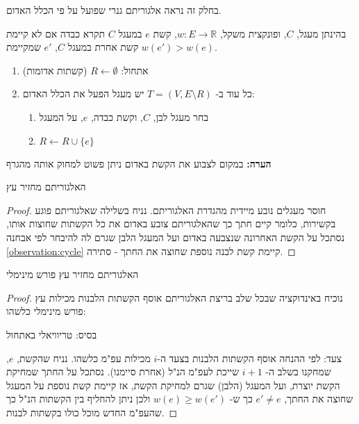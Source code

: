 בחלק זה נראה אלגוריתם גנרי שפועל על פי הכלל האדום.

\begin{definition}
בהינתן מעגל, $C$, ופונקצית משקל, 
$w: E \to \mathbb{R}$,
קשת $e$ במעגל $C$ תקרא כבדה אם לא קיימת קשת אחרת במעגל $C$, 
$e'$
שמקיימת 
$w(e') > w(e)$.
\end{definition}
\begin{enumerate}
\item
אתחול:
$R \leftarrow \emptyset$ 
(קשתות אדומות)
\item
כל עוד ב-%
$T = (V, E \setminus R)$
יש מעגל הפעל את הכלל האדום:
\begin{enumerate}
\item
בחר מעגל לבן, $C$, וקשת כבדה, $e$, על המעגל
\item
$R \leftarrow R \cup \{e\}$
\end{enumerate}
\end{enumerate}

\textbf{הערה:}
במקום לצבוע את הקשת באדום ניתן פשוט למחוק אותה מהגרף
\begin{claim}
האלגוריתם מחזיר עץ
\end{claim}
\begin{proof}
חוסר מעגלים נובע מיידית מהגדרת האלגוריתם.
נניח בשלילה שאלגוריתם פוגע בקשירות, כלומר קיים חתך כך שהאלגוריתם צובע באדום את כל הקשתות 
שחוצות אותו, נסתכל על הקשת האחרונה שנצבעה באדום ועל המעגל הלבן שגרם לה להיבחר לפי אבחנה 
\ref{observation:cycle}
קיימת קשת לבנה נוספת שחוצה את החתך - סתירה.
\end{proof}

\begin{claim}
\label{claim:red}
האלגוריתם מחזיר עץ פורש מינימלי
\end{claim}

\begin{proof}
נוכיח באינדוקציה שבכל שלב בריצת האלגוריתם אוסף הקשתות הלבנות מכילות עץ פורש מינימלי כלשהו:

בסיס: טריוויאלי באתחול

צעד: לפי ההנחה אוסף הקשתות הלבנות בצעד ה-$i$ מכילות עפ"מ כלשהו.
נניח שהקשת, $e$, שמחקנו בשלב ה-%
$i+1$
שייכת לעפ"מ הנ"ל (אחרת סיימנו).
נסתכל על החתך שמחיקת הקשת יוצרת, ועל המעגל (הלבן) שגרם למחיקת הקשת,
אז קיימת קשת נוספת על המעגל שחוצה את החתך, 
$e' \neq e$
כך ש-%
$w(e) \geq w(e')$
ולכן ניתן להחליף בין הקשתות הנ"ל כך שהעפ"מ החדש מוכל כולו בקשתות לבנות.
\end{proof}



